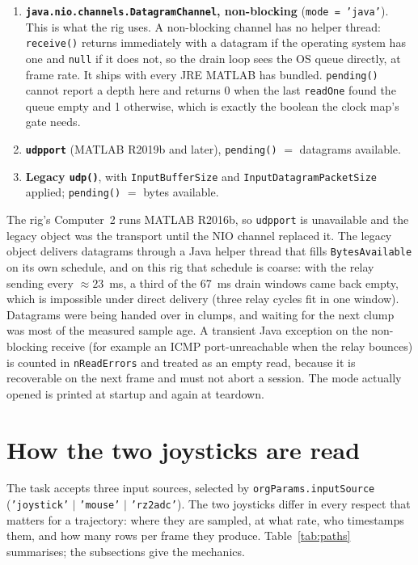 \documentclass[11pt,a4paper]{article}
\newcommand{\code}[1]{\texttt{\small #1}}
\begin{document}
\begin{enumerate}[leftmargin=*,itemsep=2pt]
\item \textbf{\code{java.nio.channels.DatagramChannel}, non-blocking}
(\code{mode = 'java'}). This is what the rig uses. A non-blocking channel has no
helper thread: \code{receive()} returns immediately with a datagram if the
operating system has one and \code{null} if it does not, so the drain loop sees
the OS queue directly, at frame rate. It ships with every JRE MATLAB has
bundled. \code{pending()} cannot report a depth here and returns 0 when the last
\code{readOne} found the queue empty and 1 otherwise, which is exactly the
boolean the clock map's gate needs.
\item \textbf{\code{udpport}} (MATLAB R2019b and later),
\code{pending()} $=$ datagrams available.
\item \textbf{Legacy \code{udp()}}, with \code{InputBufferSize} and
\code{InputDatagramPacketSize} applied; \code{pending()} $=$ bytes available.
\end{enumerate}

The rig's Computer~2 runs MATLAB R2016b, so \code{udpport} is unavailable and
the legacy object was the transport until the NIO channel replaced it. The
legacy object delivers datagrams through a Java helper thread that fills
\code{BytesAvailable} on its own schedule, and on this rig that schedule is
coarse: with the relay sending every $\approx 23$~ms, a third of the 67~ms
drain windows came back empty, which is impossible under direct delivery
(three relay cycles fit in one window). Datagrams were being handed over in
clumps, and waiting for the next clump was most of the measured sample age. A
transient Java exception on the non-blocking receive (for example an ICMP
port-unreachable when the relay bounces) is counted in \code{nReadErrors} and
treated as an empty read, because it is recoverable on the next frame and must
not abort a session. The mode actually opened is printed at startup and again at
teardown.

\section{How the two joysticks are read}
\label{sec:read}

The task accepts three input sources, selected by \code{orgParams.inputSource}
(\code{'joystick'} $|$ \code{'mouse'} $|$ \code{'rz2adc'}). The two joysticks
differ in every respect that matters for a trajectory: where they are sampled,
at what rate, who timestamps them, and how many rows per frame they produce.
Table~\ref{tab:paths} summarises; the subsections give the mechanics.
\end{document}
